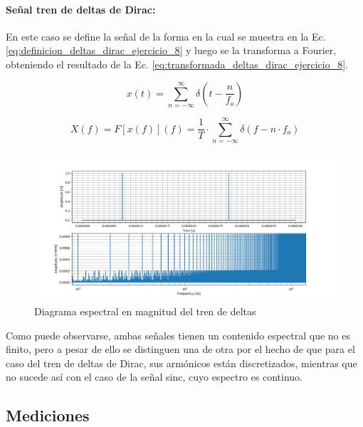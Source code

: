 \paragraph{Se\~nal tren de deltas de Dirac:} En este caso se define la se\~nal de la forma en la cual se muestra en la Ec. \ref{eq:definicion_deltas_dirac_ejercicio_8} y luego
se la transforma a Fourier, obteniendo el resultado de la Ec. \ref{eq:transformada_deltas_dirac_ejercicio_8}.

\begin{equation}
    x(t) = \sum_{n = - \infty}^{\infty} \delta(t - \frac{n}{f_o})
    \label{eq:definicion_deltas_dirac_ejercicio_8}
\end{equation}

\begin{equation}
    X(f) = F \left[ x(f) \right](f) = \frac{1}{T} \cdot \sum_{n = - \infty}^{\infty} \delta(f - n \cdot f_o)
    \label{eq:transformada_deltas_dirac_ejercicio_8}
\end{equation}

\begin{figure}[H]
    \centering
    \includegraphics[scale=0.45]{Recursos/tren_delta_dirac.png}
    \caption{Diagrama espectral en magnitud del tren de deltas}
\end{figure}

Como puede observarse, ambas se\~nales tienen un contenido espectral que no es finito, pero a pesar de ello se distinguen una de otra
por el hecho de que para el caso del tren de deltas de Dirac, sus arm\'onicos est\'an discretizados, mientras que no sucede as\'i con el caso de 
la se\~nal sinc, cuyo espectro es continuo.

\subsection{Mediciones}

